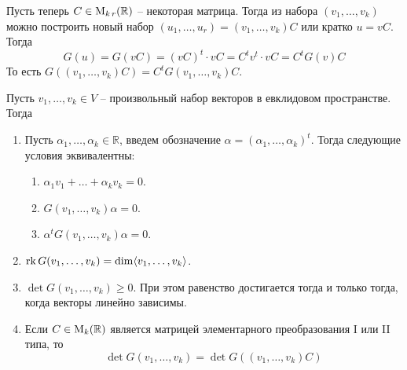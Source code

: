 Пусть теперь $C\in \operatorname{M}_{k\,r}(\mathbb R)$ -- некоторая матрица.
Тогда из набора $(v_1,\ldots,v_k)$ можно построить новый набор $(u_1,\ldots,u_r) = (v_1,\ldots,v_k)C$ или кратко $u = vC$.
Тогда 
\[
G(u) = G(vC) = (vC)^t \cdot vC = C^t v^t \cdot v C = C^t G(v) C
\]
То есть $G((v_1,\ldots,v_k)C) = C^t G(v_1,\ldots,v_k)C$.


\begin{claim}
\label{claim::GramMatrixFull}
Пусть $v_1,\ldots,v_k\in V$ -- произвольный набор векторов в евклидовом пространстве.
Тогда
\begin{enumerate}
\item Пусть $\alpha_1,\ldots,\alpha_k \in \mathbb R$, введем обозначение $\alpha = (\alpha_1,\ldots,\alpha_k)^t$.
Тогда следующие условия эквивалентны:
\begin{enumerate}
\item $\alpha_1 v_1 + \ldots + \alpha_k v_k = 0$.

\item $G(v_1,\ldots,v_k)\alpha= 0$.

\item $\alpha^tG(v_1,\ldots,v_k)\alpha= 0$.
\end{enumerate}

\item $\operatorname{rk} G(v_1,\ldots,v_k) = \dim \langle v_1,\ldots,v_k\rangle$.

\item  $\det G(v_1,\ldots,v_k)\geqslant 0$.
При этом равенство достигается тогда и только тогда, когда векторы линейно зависимы.

\item Если $C\in\operatorname{M}_{k}(\mathbb R)$ является матрицей элементарного преобразования I или II типа, то 
\[
\det G(v_1,\ldots,v_k) = \det G((v_1,\ldots,v_k)C)
\]
\end{enumerate}
\end{claim}
